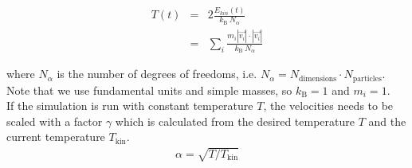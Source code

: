\documentclass{article}
\begin{document}
\begin{eqnarray}
    T(t) &=& 2 \frac{E_{kin}(t)}{k_\mathrm{B} \ N_\alpha }\\
         &=& \sum_i \frac{m_i|\vec{v_i}| \cdot |\vec{v_i}|}{k_\mathrm{B} \ N_\alpha}
\end{eqnarray}

where $N_\alpha$ is the number of degrees of freedoms, i.e. $N_\alpha = N_{\mathrm{dimensions}} \cdot N_{\mathrm{particles}}$. Note that we use fundamental units and simple masses, so $k_\mathrm{B} = 1$ and $m_i = 1$.\\

If the simulation is run with constant temperature $T$, the velocities needs to be scaled with a factor $\gamma$ which is calculated from the desired temperature $T$ and the current temperature $T_\mathrm{kin}$.
\begin{eqnarray}
    \alpha = \sqrt{T/T_\mathrm{kin}}
    \label{eq:temp_factor}
\end{eqnarray}

% 


%
%
%
%
%
%
\end{document}
